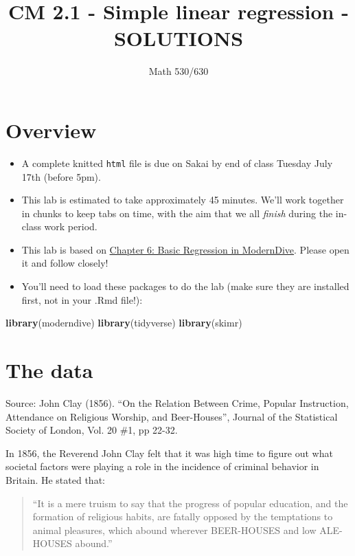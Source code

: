 \documentclass[]{article}
\title{CM 2.1 - Simple linear regression - SOLUTIONS}
\subtitle{Math 530/630}
\author{}
\date{}
\newenvironment{Shaded}{\begin{snugshade}}{\end{snugshade}}
\newcommand{\KeywordTok}[1]{\textcolor[rgb]{0.13,0.29,0.53}{\textbf{#1}}}
\newcommand{\NormalTok}[1]{#1}
\providecommand{\tightlist}{%
  \setlength{\itemsep}{0pt}\setlength{\parskip}{0pt}}
\begin{document}
\maketitle

{
\setcounter{tocdepth}{2}
\tableofcontents
}
\hypertarget{overview}{%
\section{Overview}\label{overview}}

\begin{itemize}
\tightlist
\item
  A complete knitted \texttt{html} file is due on Sakai by end of class
  Tuesday July 17th (before 5pm).
\item
  This lab is estimated to take approximately 45 minutes. We'll work
  together in chunks to keep tabs on time, with the aim that we all
  \emph{finish} during the in-class work period.
\item
  This lab is based on
  \href{http://moderndive.netlify.com/6-regression.html}{Chapter 6:
  Basic Regression in ModernDive}. Please open it and follow closely!
\item
  You'll need to load these packages to do the lab (make sure they are
  installed first, not in your .Rmd file!):
\end{itemize}

\begin{Shaded}
\begin{Highlighting}[]
\KeywordTok{library}\NormalTok{(moderndive)}
\KeywordTok{library}\NormalTok{(tidyverse)}
\KeywordTok{library}\NormalTok{(skimr)}
\end{Highlighting}
\end{Shaded}

\hypertarget{the-data}{%
\section{The data}\label{the-data}}

Source: John Clay (1856). ``On the Relation Between Crime, Popular
Instruction, Attendance on Religious Worship, and Beer-Houses'', Journal
of the Statistical Society of London, Vol. 20 \#1, pp 22-32.

In 1856, the Reverend John Clay felt that it was high time to figure out
what societal factors were playing a role in the incidence of criminal
behavior in Britain. He stated that:

\begin{quote}
``It is a mere truism to say that the progress of popular education, and
the formation of religious habits, are fatally opposed by the
temptations to animal pleasures, which abound wherever BEER-HOUSES and
low ALE-HOUSES abound.''
\end{quote}
\end{document}
